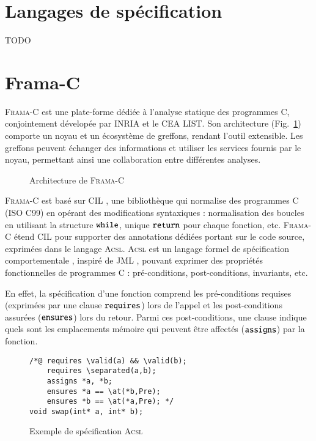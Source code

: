 \documentclass[french]{spimufcphdthesis}
\begin{document}
\section{Langages de spécification}


TODO


\section{Frama-C}


\textsc{Frama-C} \cite{Frama-C} est une plate-forme dédiée à l'analyse statique
des programmes C, conjointement dévelopée par INRIA et le CEA LIST. Son
architecture (Fig.~\ref{fig:archi}) comporte un noyau et un écosystème de
greffons, rendant l’outil extensible. Les greffons peuvent échanger des
informations et utiliser les  services fournis par le noyau, permettant ainsi
une collaboration entre différentes analyses.




\begin{figure}[h]
  \begin{center}
  
  \end{center}
  \caption{Architecture de \textsc{Frama-C}}\label{fig:archi}
\end{figure}


\textsc{Frama-C} est basé sur CIL \cite{CIL}, une bibliothèque qui normalise des
programmes C (ISO C99) en opérant des modifications syntaxiques : normalisation
des boucles en utilisant la structure ${\tt while}$, unique ${\tt return}$ pour
chaque fonction, etc. \textsc{Frama-C} étend CIL pour supporter des annotations
dédiées portant sur le code source, exprimées dans le langage \textsc{Acsl}.
\textsc{Acsl} \cite{ACSL} est un langage formel de spécification
comportementale \cite{BISL}, inspiré de JML \cite{JML}, pouvant exprimer des
propriétés fonctionnelles de programmes C : pré-conditions, post-conditions,
invariants, etc.

En effet, la spécification d'une fonction comprend les pré-conditions requises
(exprimées par une clause ${\tt requires}$) lors de l'appel et les
post-conditions assurées (${\tt ensures}$) lors du retour. Parmi ces
post-conditions, une clause indique quels sont les emplacements mémoire qui
peuvent être affectés (${\tt assigns}$) par la fonction.


\begin{figure}[h]
\begin{lstlisting}
/*@ requires \valid(a) && \valid(b);
    requires \separated(a,b);
    assigns *a, *b;
    ensures *a == \at(*b,Pre);
    ensures *b == \at(*a,Pre); */
void swap(int* a, int* b);
\end{lstlisting}
\caption{Exemple de spécification \textsc{Acsl}}\label{fig:acsl-spec}
\end{figure}
\end{document}
